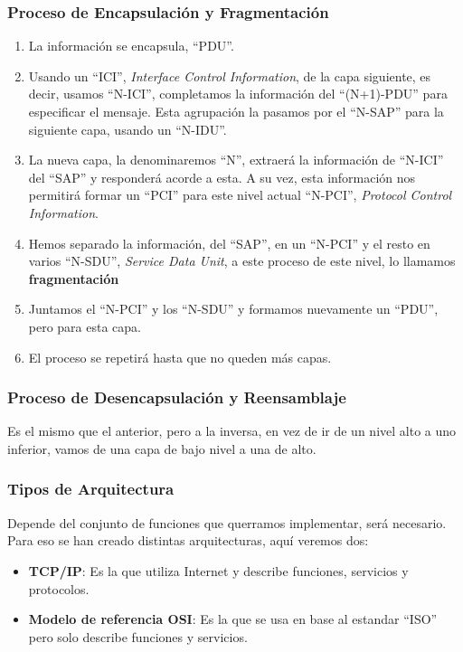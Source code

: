 \subsubsection{Proceso de Encapsulación y Fragmentación}
\begin{enumerate}
        \item La información se encapsula, ``PDU''.
        \item Usando un ``ICI'', \textit{Interface Control Information}, de la capa siguiente, es decir, usamos ``N-ICI'', completamos la información del ``(N+1)-PDU'' para especificar el mensaje. Esta agrupación la pasamos por el ``N-SAP'' para la siguiente capa, usando un ``N-IDU''.
        \item La nueva capa, la denominaremos ``N'', extraerá la información de ``N-ICI'' del ``SAP'' y responderá acorde a esta. A su vez, esta información nos permitirá formar un ``PCI'' para este nivel actual ``N-PCI'', \textit{Protocol Control Information}.
        \item Hemos separado la información, del ``SAP'', en un ``N-PCI'' y el resto en varios ``N-SDU'', \textit{Service Data Unit}, a este proceso de este nivel, lo llamamos \textbf{fragmentación}
        \item Juntamos el ``N-PCI'' y los ``N-SDU'' y formamos nuevamente un ``PDU'', pero para esta capa.
        \item El proceso se repetirá hasta que no queden más capas.
\end{enumerate}
\subsubsection{Proceso de Desencapsulación y Reensamblaje}
\noindent Es el mismo que el anterior, pero a la inversa, en vez de ir de un nivel alto a uno inferior, vamos de una capa de bajo nivel a una de alto.
\subsubsection{Tipos de Arquitectura}
\noindent Depende del conjunto de funciones que querramos implementar, será necesario. Para eso se han creado distintas arquitecturas, aquí veremos dos:
\begin{itemize}
        \item \textbf{TCP/IP}: Es la que utiliza Internet y describe funciones, servicios y protocolos.
        \item \textbf{Modelo de referencia OSI}: Es la que se usa en base al estandar ``ISO'' pero solo describe funciones y servicios.
\end{itemize}
